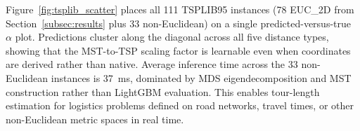 Figure~\ref{fig:tsplib_scatter} places all 111 TSPLIB95 instances (78 EUC\_2D from Section~\ref{subsec:results} plus 33 non-Euclidean) on a single predicted-versus-true $\alpha$ plot. Predictions cluster along the diagonal across all five distance types, showing that the MST-to-TSP scaling factor is learnable even when coordinates are derived rather than native. Average inference time across the 33 non-Euclidean instances is 37~ms, dominated by MDS eigendecomposition and MST construction rather than LightGBM evaluation. This enables tour-length estimation for logistics problems defined on road networks, travel times, or other non-Euclidean metric spaces in real time.

